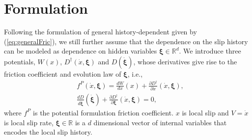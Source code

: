 \section{Formulation}
\label{sec:formulation}
Following the formulation of general history-dependent given by (\ref{eq:generalFric}), 
we still further assume that the dependence on the slip history can be modeled as dependence on hidden variables $\bm{\xi} \in \mathbb{R}^d$. 
We introduce three potentials, 
$W(x)$, 
$D^\dagger(\dot{x}, \bm{\xi})$ and $D(\dot{\bm{\xi}})$, 
whose derivatives give rise to the friction coefficient and evolution law of $\bm{\xi}$, i.e., 
\begin{align}
    &f^{P}(\dot{x}, \boldsymbol{\xi}) = \frac{d W}{d x}(x) + \frac{\partial D^\dagger}{\partial \dot{x}}(\dot{x}, \bm{\xi}) \label{eq:fpot}, \\
    &\frac{d D}{d \dot{\boldsymbol{\xi}}}(\dot{\bm{\xi}}) + \frac{\partial D^\dagger}{\partial \boldsymbol{\xi}}(\dot{x}, \bm{\xi}) = 0 \label{eq:evolutionXi},  
\end{align}
where $f^{P}$ is the potential formulation friction coefficient.  
$x$ is local slip and $V = \dot{x}$ is local slip rate, 
$\bm{\xi} \in \mathbb{R}$ is a $d$ dimensional vector of internal variables that encodes the local slip history. 

